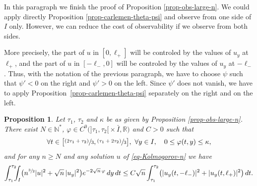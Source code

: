 \documentclass[10pt]{amsart}
\newcommand{\psfrac}[2]{\sfrac{(#1)}{#2}}
\theoremstyle{plain}
\newtheorem{proposition}[theorem]{Proposition}
\theoremstyle{definition}
\newcommand{\abs}[1]{\vert #1\vert}
\newcommand{\1}{\mathds 1}
\newcommand{\R}{\mathbb{R}}
\newcommand{\N}{\mathbb{N}}
\let\k\kappa
\let\f\varphi
\begin{document}
In this paragraph we finish the proof of Proposition \ref{prop-obs-large-n}.
We could apply directly Proposition \ref{prop-carlemen-theta-psi} and observe from one side of $I$ only. However, we can reduce the cost of observability if we observe from both sides.

More precisely, the part of $u$ in $[0,\ell_+]$ will be controled by the values of $u_y$ at $\ell_+$, and the part of $u$ in $[-\ell_-,0]$ will be controled by the values of $u_y$ at $-\ell_-$. Thus, with the notation of the previous paragraph, we have to choose $\psi$ such that $\psi' < 0$ on the right and $\psi' > 0$ on the left. Since $\psi'$ does not vanish, we have to apply Proposition~\ref{prop-carlemen-theta-psi} separately on the right and on the left.

\begin{proposition} \label{prop-def-phi}
Let $\tau_1$, $\tau_2$ and $\kappa$ be as given by Proposition \ref{prop-obs-large-n}. There exist $N \in \N^*$, $\f \in C^0 \bigl(]\tau_1,\tau_2[{}\times \bar I,\R \bigr)$ and $C > 0$ such that
\begin{equation} \label{eq-phi}
\forall t \in \bigl[ \psfrac {2\tau_1 + \tau_2} 3 , \psfrac {\tau_1 + 2 \tau_2}{3} \bigr],\ \forall y \in I, \quad 0 \leq \f(t,y) \leq \k,
\end{equation}
and for any $n \geq N$ and any solution $u$ of \eqref{eq-Kolmogorov-n} we have
\[
\int_{\tau_1}^{\tau_2}\hspace*{-2mm} \int_{I} \bigl(n^{\sfrac 32} \abs u^2 + \sqrt n\,\abs{u_y}^2 \bigr) e^{-2\sqrt n\,\f} \, dy \, dt \leq C \sqrt n \int_{\tau_1}^{\tau_2} \bigl(\abs{u_y(t,-\ell_-)}^2 + \abs{u_y(t,\ell_+)}^2\bigr) \, dt.
\]
\end{proposition}
\end{document}
